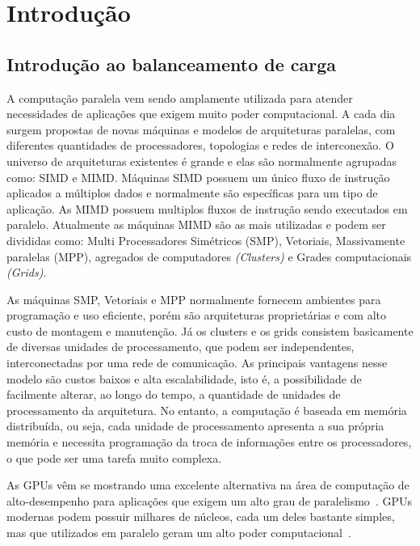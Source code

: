 \cleardoublepage
\pagestyle{fancy}

\chapter{Introdução}\label{intro}

\section{Introdução ao balanceamento de carga}\label{cap1:intro}

A computação paralela vem sendo amplamente utilizada para atender necessidades de aplicações que exigem muito poder computacional. A cada dia surgem propostas de novas máquinas e modelos de arquiteturas paralelas, com diferentes quantidades de processadores, topologias e redes de interconexão. O universo de arquiteturas existentes é grande e elas são normalmente agrupadas como: SIMD e MIMD. Máquinas SIMD possuem um único fluxo de instrução aplicados a múltiplos dados e normalmente são específicas para um tipo de aplicação. As MIMD possuem multiplos fluxos de instrução sendo executados em paralelo. Atualmente as máquinas MIMD são as mais utilizadas e podem ser divididas como: Multi Processadores Simétricos (SMP), Vetoriais, Massivamente paralelas (MPP), agregados de computadores \emph{(Clusters)} e Grades computacionais \emph{(Grids)}. 

As máquinas SMP, Vetoriais e MPP normalmente fornecem ambientes para programação e uso eficiente, porém são arquiteturas proprietárias e com alto custo de montagem e manutenção. Já os clusters e os grids consistem basicamente de diversas unidades de processamento, que podem ser independentes, interconectadas por uma rede de comunicação. As principais vantagens nesse modelo são custos baixos e alta escalabilidade, isto  é, a possibilidade de facilmente alterar, ao longo do tempo, a quantidade de unidades de processamento da arquitetura. No entanto, a computação é baseada em memória distribuída, ou seja, cada unidade de processamento apresenta a sua própria memória e necessita programação da troca de informações entre os processadores, o que pode ser uma tarefa muito complexa.

As GPUs vêm se mostrando uma excelente alternativa na área de computação de
alto-desempenho para aplicações que exigem um alto grau de
paralelismo~\cite{gpu}. GPUs modernas podem possuir milhares de núcleos, cada um
deles bastante simples, mas que utilizados em paralelo geram um alto poder
computacional~\cite{cuda}.

